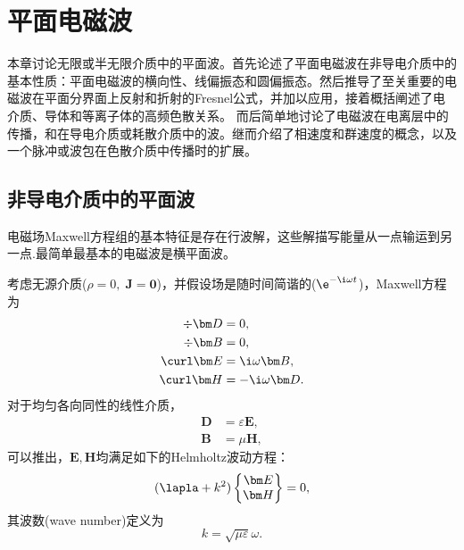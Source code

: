 \chapter{平面电磁波}
\label{chap:plane wave}

本章讨论无限或半无限介质中的平面波。首先论述了平面电磁波在非导电介质中的基本性质：平面电磁波的横向性、线偏振态和圆偏振态。然后推导了至关重要的电磁波在平面分界面上反射和折射的Fresnel公式，并加以应用，接着概括阐述了电介质、导体和等离子体的高频色散关系。%
而后简单地讨论了电磁波在电离层中的传播，和在导电介质或耗散介质中的波。继而介绍了相速度和群速度的概念，以及一个脉冲或波包在色散介质中传播时的扩展。%

\section{非导电介质中的平面波}

电磁场Maxwell方程组的基本特征是存在行波解，这些解描写能量从一点输运到另一点.最简单最基本的电磁波是横平面波。%


考虑无源介质($\rho=0,\;\bm J=\bm 0$)，并假设场是随时间简谐的($\e^{-\i\omega t}$)，Maxwell方程为
\begin{subequations}
    \begin{align}
        \div\bm D&=0,\\
        \div\bm B&=0,\\
        \curl\bm E&=\i\omega\bm B,\\
        \curl\bm H&=-\i\omega\bm D. 
    \end{align}
\end{subequations}
对于均匀各向同性的线性介质，
\begin{align*}
    \bm D&=\varepsilon\bm E,\\
    \bm B&=\mu\bm H,
\end{align*}
可以推出，$\bm E,\bm H$均满足如下的Helmholtz波动方程：
\begin{equation}
    (\lapla+k^2)\begin{Bmatrix}
        \bm E\\\bm H
    \end{Bmatrix}=0,
\end{equation}
其波数(wave number)定义为
\begin{equation}
    k=\sqrt{\mu\varepsilon}\omega.
\end{equation}

